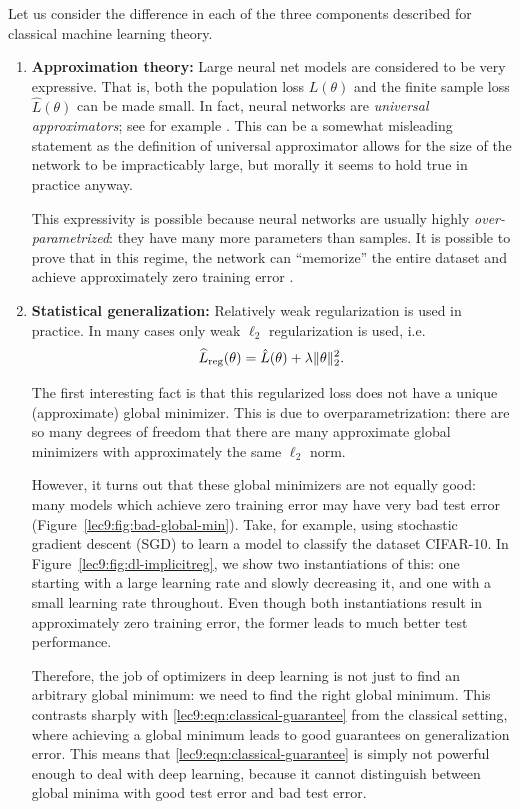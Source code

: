 Let us consider the difference in each of the three components described for classical machine learning theory. 

\begin{enumerate} 
\item {\bf Approximation theory:} Large neural net models are considered to be very expressive. That is, both the population loss $L(\theta)$ and the finite sample loss $\hat{L}(\theta)$ can be made small. In fact, neural networks are \textit{universal approximators}; see for example \cite{hornik1991}. This can be a somewhat misleading statement as the definition of universal approximator allows for the size of the network to be impracticably large, but morally it seems to hold true in practice anyway.
        
This expressivity is possible because neural networks are usually highly \textit{over-parametrized}: they have many more parameters than samples. It is possible to prove that in this regime, the network can ``memorize'' the entire dataset and achieve approximately zero training error \cite{arpit2017memorization}.
    
\item {\bf Statistical generalization:} Relatively weak regularization is used in practice. In many cases only weak $\ell_2$ regularization is used, i.e.
\begin{equation}
\widehat{L}_{\textup{reg}}(\theta)=\hat{L}(\theta)+\lambda\|\theta\|_2^2.
\end{equation}
    
The first interesting fact is that this regularized loss does not have a unique (approximate) global minimizer. This is due to overparametrization: there are so many degrees of freedom that there are many approximate global minimizers with approximately the same $\ell_2$ norm.
    
However, it turns out that these global minimizers are not equally good: many models which achieve zero training error may have very bad test error (Figure~\ref{lec9:fig:bad-global-min}). Take, for example, using stochastic gradient descent (SGD) to learn a model to classify the dataset CIFAR-10. In Figure~\ref{lec9:fig:dl-implicitreg}, we show two instantiations of this: one starting with a large learning rate and slowly decreasing it, and one with a small learning rate throughout. Even though both instantiations result in approximately zero training error, the former leads to much better test performance. 

Therefore, the job of optimizers in deep learning is not just to find an arbitrary global minimum: we need to find the right global minimum. This contrasts sharply with \eqref{lec9:eqn:classical-guarantee} from the classical setting, where achieving a global minimum leads to good guarantees on generalization error. This means that \eqref{lec9:eqn:classical-guarantee} is simply not powerful enough to deal with deep learning, because it cannot distinguish between global minima with good test error and bad test error.


\end{enumerate}
